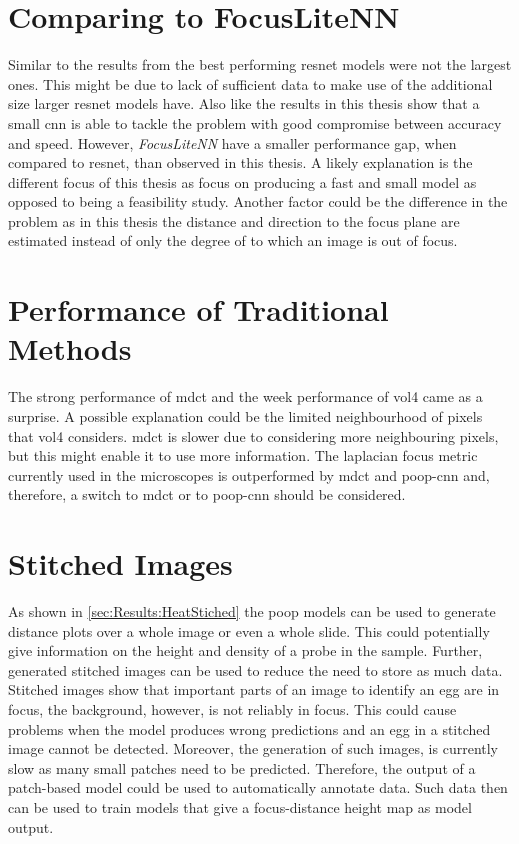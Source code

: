 \section{Comparing to FocusLiteNN}
\label{ch:Discussion:FocusLiteNN}

Similar to the results from \textcite{wang2020focuslitenn} the best performing \ac{resnet} models were not the largest ones. This might be due to lack of sufficient data to make use of the additional size larger \ac{resnet} models have. Also like \citeauthor{wang2020focuslitenn} the results in this thesis show that a small \ac{cnn} is able to tackle the problem with good compromise between accuracy and speed. However, \citeauthor{wang2020focuslitenn} \textit{FocusLiteNN} have a smaller performance gap, when compared to \ac{resnet}, than observed in this thesis. A likely explanation is the different focus of this thesis as \citeauthor{wang2020focuslitenn} focus on producing a fast and small model as opposed to being a feasibility study. Another factor could be the difference in the problem as in this thesis the distance and direction to the focus plane are estimated instead of only the degree of to which an image is out of focus.

\section{Performance of Traditional Methods}
\label{ch:Discussion:PerformanceTraditional}

The strong performance of \ac{mdct} and the week performance of \ac{vol4} came as a surprise. A possible explanation could be the limited neighbourhood of pixels that \ac{vol4} considers. \Ac{mdct} is slower due to considering more neighbouring pixels, but this might enable it to use more information. The \Ac{laplacian} focus metric currently used in the microscopes is outperformed by \ac{mdct} and \ac{poop}-\ac{cnn} and, therefore, a switch to \ac{mdct} or to \ac{poop}-\ac{cnn} should be considered.

\section{Stitched Images}
\label{ch:Discussion:StitchedImages}

As shown in \autoref{sec:Results:HeatStiched} the \ac{poop} models can be used to generate distance plots over a whole image or even a whole slide. This could potentially give information on the height and density of a probe in the sample. Further, generated stitched images can be used to reduce the need to store as much data. Stitched images show that important parts of an image to identify an egg are in focus, the background, however, is not reliably in focus. This could cause problems when the model produces wrong predictions and an egg in a stitched image cannot be detected. Moreover, the generation of such images, is currently slow as many small patches need to be predicted. Therefore, the output of a patch-based model could be used to automatically annotate data. Such data then can be used to train models that give a focus-distance height map as model output.

